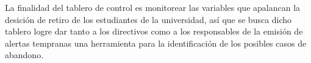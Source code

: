 
La finalidad del tablero de control es monitorear las variables que apalancan la desición de retiro de los estudiantes de la universidad, así que se busca dicho tablero logre dar tanto a los directivos como a los responsables de la emisión de alertas tempranas una herramienta para la identificación de los posibles casos de abandono.
